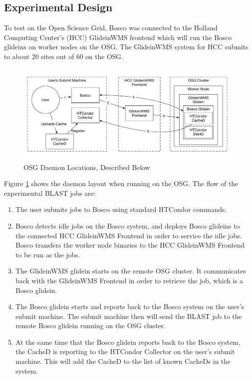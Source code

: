 \subsection{Experimental Design}
To test on the Open Science Grid, Bosco was connected to the Holland Computing Center's (HCC) GlideinWMS frontend which will run the Bosco glideins on worker nodes on the OSG.  The GlideinWMS system for HCC submits to about 20 sites out of 60 on the OSG.

\begin{figure}[ht]
	\centering
	\includegraphics[width=\textwidth]{images/OSGDaemonLayout.pdf}
	\caption{OSG Daemon Locations, Described Below}
	\label{fig:osgdaemonlayoutcached}
\end{figure}

Figure \ref{fig:osgdaemonlayoutcached} shows the daemon layout when running on the OSG.  The flow of the experimental BLAST jobs are:

\begin{enumerate}
	\item The user submits jobs to Bosco using standard HTCondor commands.
	
	\item Bosco detects idle jobs on the Bosco system, and deploys Bosco glideins to the connected HCC GlideinWMS Frontend in order to service the idle jobs.  Bosco transfers the worker node binaries to the HCC GlideinWMS Frontend to be run as the jobs.
	
	\item The GlideinWMS glidein starts on the remote OSG cluster.  It communicates back with the GlideinWMS Frontend in order to retrieve the job, which is a Bosco glidein.
	
	\item The Bosco glidein starts and reports back to the Bosco system on the user's submit machine.  The submit machine then will send the BLAST job to the remote Bosco glidein running on the OSG cluster.
	
	\item At the same time that the Bosco glidein reports back to the Bosco system, the CacheD is reporting to the HTCondor Collector on the user's submit machine.  This will add the CacheD to the list of known CacheDs in the system.
\end{enumerate}

